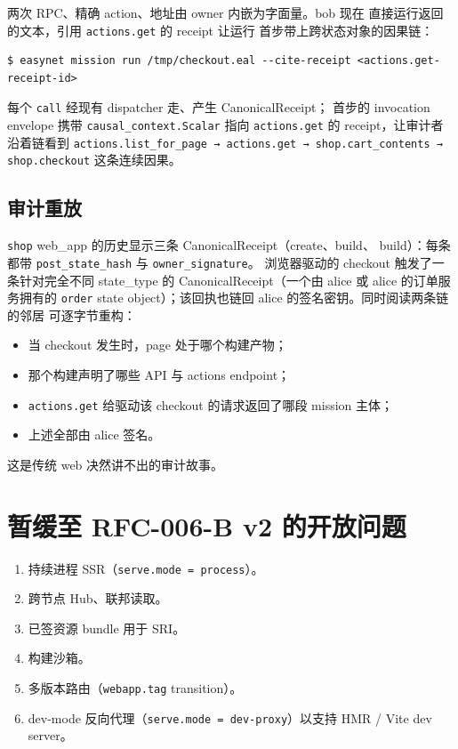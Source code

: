 \documentclass[11pt,a4paper]{article}
\theoremstyle{definition}
\begin{document}
\noindent 两次 RPC、精确 action、地址由 owner 内嵌为字面量。bob 现在
直接运行返回的文本，引用 \texttt{actions.get} 的 receipt 让运行
首步带上跨状态对象的因果链：

\begin{lstlisting}
$ easynet mission run /tmp/checkout.eal --cite-receipt <actions.get-receipt-id>
\end{lstlisting}

每个 \texttt{call} 经现有 dispatcher 走、产生 CanonicalReceipt；
首步的 invocation envelope 携带 \texttt{causal\_context.Scalar}
指向 \texttt{actions.get} 的 receipt，让审计者沿着链看到
\texttt{actions.list\_for\_page → actions.get →
shop.cart\_contents → shop.checkout} 这条连续因果。

\subsection{审计重放}

\texttt{shop} web\_app 的历史显示三条 CanonicalReceipt（create、build、
build）：每条都带 \texttt{post\_state\_hash} 与 \texttt{owner\_signature}。
浏览器驱动的 checkout 触发了一条针对完全不同 state\_type 的
CanonicalReceipt（一个由 alice 或 alice 的订单服务拥有的 \texttt{order}
state object）；该回执也链回 alice 的签名密钥。同时阅读两条链的邻居
可逐字节重构：

\begin{itemize}[leftmargin=2em,itemsep=0.12em]
    \item 当 checkout 发生时，page 处于哪个构建产物；
    \item 那个构建声明了哪些 API 与 actions endpoint；
    \item \texttt{actions.get} 给驱动该 checkout 的请求返回了哪段
    mission 主体；
    \item 上述全部由 alice 签名。
\end{itemize}

\noindent 这是传统 web 决然讲不出的审计故事。

\section{暂缓至 RFC-006-B v2 的开放问题}
\label{sec:open}

\begin{enumerate}[leftmargin=2.2em,itemsep=0.15em]
    \item 持续进程 SSR（\texttt{serve.mode = process}）。
    \item 跨节点 Hub、联邦读取。
    \item 已签资源 bundle 用于 SRI。
    \item 构建沙箱。
    \item 多版本路由（\texttt{webapp.tag} transition）。
    \item dev-mode 反向代理（\texttt{serve.mode = dev-proxy}）以支持
    HMR / Vite dev server。
\end{enumerate}
\end{document}
